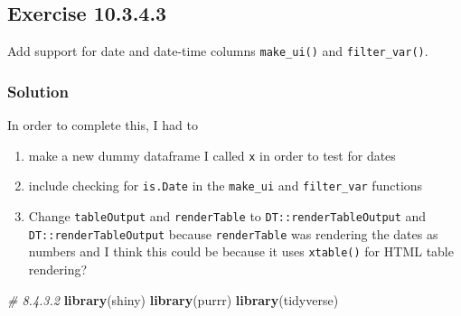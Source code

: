 \documentclass[]{book}
\newenvironment{Shaded}{\begin{snugshade}}{\end{snugshade}}
\newcommand{\CommentTok}[1]{\textcolor[rgb]{0.56,0.35,0.01}{\textit{#1}}}
\newcommand{\KeywordTok}[1]{\textcolor[rgb]{0.13,0.29,0.53}{\textbf{#1}}}
\newcommand{\NormalTok}[1]{#1}
\providecommand{\tightlist}{%
  \setlength{\itemsep}{0pt}\setlength{\parskip}{0pt}}
\begin{document}
\hypertarget{exercise-10.3.4.3}{%
\subsection*{Exercise 10.3.4.3}\label{exercise-10.3.4.3}}

Add support for date and date-time columns \texttt{make\_ui()} and \texttt{filter\_var()}.

\begin{solution}

\hypertarget{solution-6}{%
\subsubsection*{Solution}\label{solution-6}}

In order to complete this, I had to

\begin{enumerate}
\def\labelenumi{\arabic{enumi})}
\tightlist
\item
  make a new dummy dataframe I called \texttt{x} in order to test for dates
\item
  include checking for \texttt{is.Date} in the \texttt{make\_ui} and \texttt{filter\_var} functions
\item
  Change \texttt{tableOutput} and \texttt{renderTable} to \texttt{DT::renderTableOutput} and \texttt{DT::renderTableOutput} because \texttt{renderTable} was rendering the dates as numbers and I think this could be because it uses \texttt{xtable()} for HTML table rendering?
\end{enumerate}

\begin{Shaded}
\begin{Highlighting}[]
\CommentTok{# 8.4.3.2}
\KeywordTok{library}\NormalTok{(shiny)}
\KeywordTok{library}\NormalTok{(purrr)}
\KeywordTok{library}\NormalTok{(tidyverse)}


\end{Highlighting}
\end{Shaded}
\end{solution}
\end{document}
